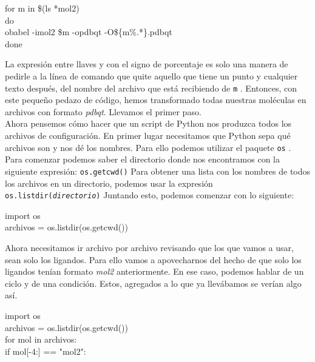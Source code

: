 \documentclass[10pt,letterpaper]{article}
\newcommand{\inlinecode}[1]{
\colorbox{light-gray}{\texttt{#1}}
}
\newenvironment{Code}
{
\begin{lrbox}{\selvestebox}%
\begin{minipage}{\dimexpr\columnwidth-2\fboxsep\relax}
\fontfamily{\ttdefault}\selectfont
}
{\end{minipage}\end{lrbox}%
\begin{center}
\colorbox{light-gray}{\usebox{\selvestebox}}
\end{center}
}
\begin{document}
\begin{Code}
for m in \$(ls *mol2)\\
do\\
obabel -imol2 \$m -opdbqt -O\$\{m\%.*\}.pdbqt\\
done
\end{Code}

La expresi\'on entre llaves y con el signo de porcentaje es solo una manera de pedirle a la l\'inea de comando que quite aquello que tiene un punto y cualquier texto despu\'es, del nombre del archivo que est\'a recibiendo de \inlinecode{m}. Entonces, con este peque\~no pedazo de c\'odigo, hemos transformado todas nuestras mol\'eculas en archivos con formato \emph{pdbqt}. Llevamos el primer paso.\\

Ahora pensemos c\'omo hacer que un script de Python nos produzca todos los archivos de configuraci\'on. En primer lugar necesitamos que Python sepa qu\'e archivos son y nos d\'e los nombres. Para ello podemos utilizar el paquete \inlinecode{os}. Para comenzar podemos saber el directorio donde nos encontramos con la siguiente expresi\'on: \inlinecode{os.getcwd()} Para obtener una lista con los nombres de todos los archivos en un directorio, podemos usar la expresi\'on \inlinecode{os.listdir(\emph{directorio})} Juntando esto, podemos comenzar con lo siguiente:

\begin{Code}
import os\\
archivos = os.listdir(os.getcwd())
\end{Code}

Ahora necesitamos ir archivo por archivo revisando que los que vamos a usar, sean solo los ligandos. Para ello vamos a apovecharnos del hecho de que solo los ligandos ten\'ian formato \emph{mol2} anteriormente. En ese caso, podemos hablar de un ciclo y de una condici\'on. Estos, agregados a lo que ya llev\'abamos se ver\'ian algo as\'i.

\begin{Code}
import os\\
archivos = os.listdir(os.getcwd())\\
for mol in archivos:\\
\hspace*{6mm}if mol[-4:] == "mol2":
\end{Code}
\end{document}
